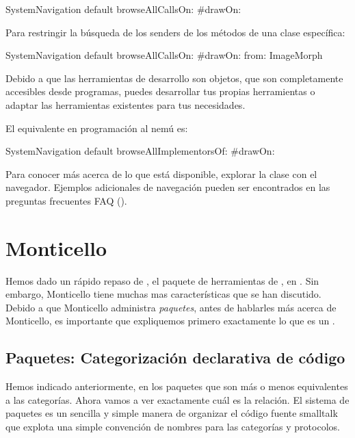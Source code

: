 \documentclass[spanish,a4paper,10pt,twoside]{book}
\begin{document}
\begin{code}{}
SystemNavigation default browseAllCallsOn: #drawOn:
\end{code}
Para restringir la b\'usqueda de los senders de los m\'etodos de una clase espec\'ifica:
\begin{code}{}
SystemNavigation default browseAllCallsOn: #drawOn: from: ImageMorph
\end{code}
Debido a que las herramientas de desarrollo son objetos, que son completamente accesibles desde programas, puedes desarrollar tus propias herramientas o adaptar las herramientas existentes para tus necesidades.

El equivalente en programaci\'on al nem\'u  es:
\begin{code}{}
SystemNavigation default browseAllImplementorsOf: #drawOn:
\end{code}

Para conocer m\'as acerca de lo que est\'a disponible, explorar la clase  con el navegador.
Ejemplos adicionales de navegaci\'on pueden ser encontrados en las preguntas
frecuentes FAQ ().

\section{Monticello}

Hemos dado un r\'apido repaso de , el paquete de herramientas de \pharo, en .
Sin embargo, Monticello tiene muchas mas caracter\'isticas que se han discutido.
Debido a que Monticello administra \emph{paquetes}, antes de hablarles m\'as acerca de Monticello, es importante que expliquemos primero exactamente lo que es un  .

\subsection{Paquetes: Categorizaci\'on declarativa de c\'odigo \pharo }

Hemos indicado anteriormente, en  los paquetes que son m\'as o menos equivalentes a las categor\'ias. Ahora vamos a ver exactamente cu\'al es la relaci\'on.
El sistema de paquetes es un sencilla y simple manera de organizar el c\'odigo fuente smalltalk que explota una simple convenci\'on de nombres para las categor\'ias y protocolos.
\end{document}
